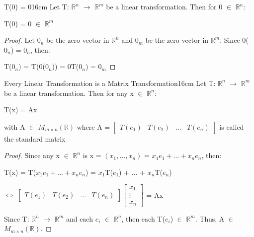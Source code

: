    \begin{wtheorem}{T(0) = 0}{16cm}
        Let T: $\mathbb{R}^n$ $\rightarrow$ $\mathbb{R}^m$
        be a linear transformation. Then for 0 $\in$ $\mathbb{R}^n$:

        \hspace{0.5cm}
        T(0) = 0 $\in$ $\mathbb{R}^m$
    \end{wtheorem}

    \begin{proof}
        Let $0_n$ be the zero vector in $\mathbb{R}^n$
        and $0_m$ be the zero vector in $\mathbb{R}^m$.
        Since 0($0_n$) = $0_n$, then:

        \hspace{0.5cm}
        T($0_n$) = T(0($0_n$)) = 0T($0_n$) = $0_m$
    \end{proof}

    \vspace{0.5cm}



    \begin{wtheorem}{Every Linear Transformation is a Matrix Transformation}{16cm}
        Let T: $\mathbb{R}^n$ $\rightarrow$ $\mathbb{R}^m$
        be a linear transformation. Then for any x $\in$ $\mathbb{R}^n$:

        \hspace{0.5cm}
        T(x) = Ax

        with A $\in$ $M_{m \times n}(\mathbb{R})$ where
        A =
        $\begin{bmatrix}
            T(e_1) & T(e_2) & \hdots & T(e_n)
        \end{bmatrix}$
        is called the {\color{lblue} standard matrix}
    \end{wtheorem}

    \begin{proof}
        Since any x $\in$ $\mathbb{R}^n$ is
        x = $(x_1,...,x_n)$
        = $x_1e_1 + ... + x_ne_n$, then:

        \hspace{0.5cm}
        T(x)
        = T($x_1e_1 + ... + x_ne_n$)
        = $x_1$T($e_1$) + ... + $x_n$T($e_n$)

        \hspace{1.5cm}
        $\Leftrightarrow$
        $\begin{bmatrix}
            T(e_1) & T(e_2) & \hdots & T(e_n)
        \end{bmatrix}
        \begin{bmatrix}
            x_1 \\
            \vdots \\
            x_n
        \end{bmatrix}$
        = Ax

        Since T: $\mathbb{R}^n$ $\rightarrow$ $\mathbb{R}^m$ and
        each $e_i$ $\in$ $\mathbb{R}^n$, then each T($e_i$) $\in$ $\mathbb{R}^m$.
        Thus, A $\in$ $M_{m \times n}(\mathbb{R})$.
    \end{proof}

